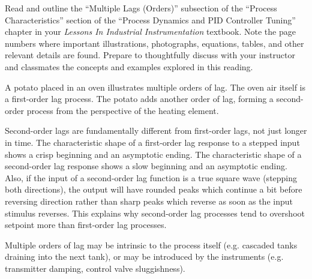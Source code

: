 

Read and outline the ``Multiple Lags (Orders)'' subsection of the ``Process Characteristics'' section of the ``Process Dynamics and PID Controller Tuning'' chapter in your {\it Lessons In Industrial Instrumentation} textbook.  Note the page numbers where important illustrations, photographs, equations, tables, and other relevant details are found.  Prepare to thoughtfully discuss with your instructor and classmates the concepts and examples explored in this reading.














A potato placed in an oven illustrates multiple orders of lag.  The oven air itself is a first-order lag process.  The potato adds another order of lag, forming a second-order process from the perspective of the heating element.

Second-order lags are fundamentally different from first-order lags, not just longer in time.  The characteristic shape of a first-order lag response to a stepped input shows a crisp beginning and an asymptotic ending.  The characteristic shape of a second-order lag response shows a slow beginning and an asymptotic ending.  Also, if the input of a second-order lag function is a true square wave (stepping both directions), the output will have rounded peaks which continue a bit before reversing direction rather than sharp peaks which reverse as soon as the input stimulus reverses.  This explains why second-order lag processes tend to overshoot setpoint more than first-order lag processes.

\vskip 10pt

Multiple orders of lag may be intrinsic to the process itself (e.g. cascaded tanks draining into the next tank), or may be introduced by the instruments (e.g. transmitter damping, control valve sluggishness).

\vskip 10pt

